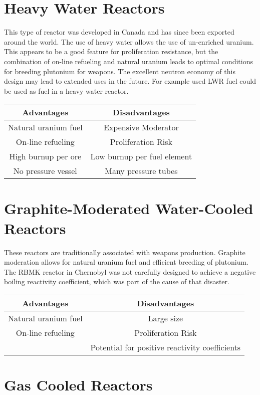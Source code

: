\section{Heavy Water Reactors}
This type of reactor was developed in Canada and has since been exported around the world. The use of heavy water allows the use of un-enriched uranium. This appears to be a good feature for proliferation resistance, but the combination of on-line refueling and natural uranium leads to optimal conditions for breeding plutonium for weapons. 
The excellent neutron economy of this design may lead to extended uses in the future. For example used LWR fuel could be used as fuel in a heavy water reactor.
\begin{table}[!h]
\begin{tabular}{c|c}
  Advantages & Disadvantages \\
  \hline
  Natural uranium fuel & Expensive Moderator \\
  On-line refueling & Proliferation Risk \\
  High burnup per ore & Low burnup per fuel element \\
  No pressure vessel & Many pressure tubes \\
\end{tabular}
\end{table}

\section{Graphite-Moderated Water-Cooled Reactors}
These reactors are traditionally associated with weapons production. Graphite moderation allows for natural uranium fuel and efficient breeding of plutonium. The RBMK reactor in Chernobyl was not carefully designed to achieve a negative boiling reactivity coefficient, which was part of the cause of that disaster.
\begin{table}[!h]
\begin{tabular}{c|c}
  Advantages & Disadvantages \\
  \hline
  Natural uranium fuel & Large size \\
  On-line refueling & Proliferation Risk \\
  & Potential for positive reactivity coefficients \\
\end{tabular}
\end{table}

\section{Gas Cooled Reactors}

